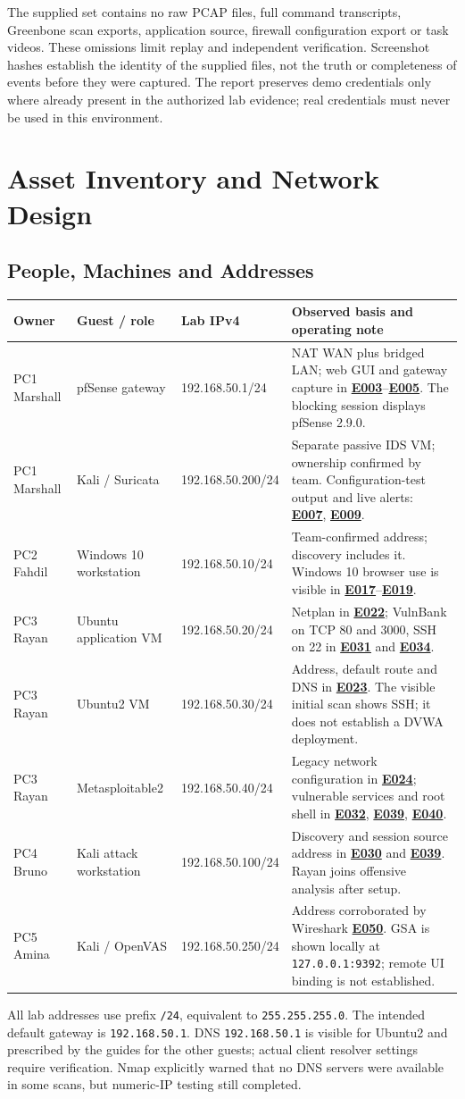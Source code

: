 \documentclass[11pt,a4paper]{article}
\newcommand{\ev}[1]{\hyperref[ev:#1]{\textbf{#1}}}
\newcommand{\partheading}[2]{\clearpage\noindent{\small\bfseries\color{steel}#1}\par\section{#2}}
\begin{document}
The supplied set contains no raw PCAP files, full command transcripts, Greenbone scan exports, application source, firewall configuration export or task videos. These omissions limit replay and independent verification. Screenshot hashes establish the identity of the supplied files, not the truth or completeness of events before they were captured. The report preserves demo credentials only where already present in the authorized lab evidence; real credentials must never be used in this environment.

\partheading{02 / ARCHITECTURE}{Asset Inventory and Network Design}
\label{sec:architecture}
\subsection{People, Machines and Addresses}
\small
\begin{longtable}{@{}L{2.1cm}L{3.4cm}L{3.2cm}L{7.4cm}@{}}
\toprule
\textbf{Owner} & \textbf{Guest / role} & \textbf{Lab IPv4} & \textbf{Observed basis and operating note}\\
\midrule\endhead
PC1 Marshall & pfSense gateway & 192.168.50.1/24 & NAT WAN plus bridged LAN; web GUI and gateway capture in \ev{E003}--\ev{E005}. The blocking session displays pfSense 2.9.0.\\
PC1 Marshall & Kali / Suricata & 192.168.50.200/24 & Separate passive IDS VM; ownership confirmed by team. Configuration-test output and live alerts: \ev{E007}, \ev{E009}.\\
PC2 Fahdil & Windows 10 workstation & 192.168.50.10/24 & Team-confirmed address; discovery includes it. Windows 10 browser use is visible in \ev{E017}--\ev{E019}.\\
PC3 Rayan & Ubuntu application VM & 192.168.50.20/24 & Netplan in \ev{E022}; VulnBank on TCP 80 and 3000, SSH on 22 in \ev{E031} and \ev{E034}.\\
PC3 Rayan & Ubuntu2 VM & 192.168.50.30/24 & Address, default route and DNS in \ev{E023}. The visible initial scan shows SSH; it does not establish a DVWA deployment.\\
PC3 Rayan & Metasploitable2 & 192.168.50.40/24 & Legacy network configuration in \ev{E024}; vulnerable services and root shell in \ev{E032}, \ev{E039}, \ev{E040}.\\
PC4 Bruno & Kali attack workstation & 192.168.50.100/24 & Discovery and session source address in \ev{E030} and \ev{E039}. Rayan joins offensive analysis after setup.\\
PC5 Amina & Kali / OpenVAS & 192.168.50.250/24 & Address corroborated by Wireshark \ev{E050}. GSA is shown locally at \texttt{127.0.0.1:9392}; remote UI binding is not established.\\
\bottomrule
\end{longtable}
\normalsize
All lab addresses use prefix \texttt{/24}, equivalent to \texttt{255.255.255.0}. The intended default gateway is \texttt{192.168.50.1}. DNS \texttt{192.168.50.1} is visible for Ubuntu2 and prescribed by the guides for the other guests; actual client resolver settings require verification. Nmap explicitly warned that no DNS servers were available in some scans, but numeric-IP testing still completed.
\end{document}
